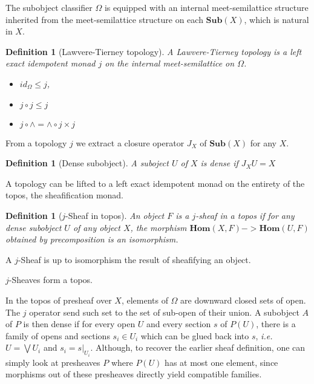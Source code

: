 \documentclass[11pt]{article}
\newtheorem{definition}[theorem]{Definition}
\newcommand{\0}{\mathbf{0}}
\newcommand{\1}{\mathbf{1}}
\begin{document}
The subobject classifier $\Omega$ is equipped with an internal meet-semilattice structure inherited from the meet-semilattice structure on each $\mathbf{Sub}(X)$, which is natural in $X$.

\begin{definition}[Lawvere-Tierney topology]
    A \emph{Lawvere-Tierney topology} is a left exact idempotent monad $j$ on the internal meet-semilattice on $\Omega$.
\begin{itemize}
    \item $ id_\Omega \leq j $,
    \item $ j\circ j \leq  j$
    \item $ j \circ \wedge = \wedge \circ j\times j$
\end{itemize}
\end{definition}

From a topology $j$ we extract a closure operator $J_X$ of $\mathbf{Sub}(X)$ for any $X$.
\begin{definition}[Dense subobject]
    A suboject $U$ of $X$ is dense if $J_XU  = X$
\end{definition}

A topology can be lifted to a left exact idempotent monad on the entirety of the topos, the sheafification monad.

\begin{definition}[$j$-Sheaf in topos]
    An object $F$ is a $j$-\emph{sheaf} in a topos if for any dense subobject $U$ of any object $X$, the morphism $\mathbf{Hom}(X, F) -> \mathbf{Hom}(U, F)$ obtained by precomposition is an isomorphism.
\end{definition}

A $j$-Sheaf is up to isomorphism the result of sheafifying an object.

$j$-Sheaves form a topos.

In the topos of presheaf over $X$, elements of $\Omega$ are downward closed sets of open. The $j$ operator send such set to the set of sub-open of their union. A subobject $A$ of $P$ is then dense if for every open $U$ and every section $s$ of $P(U)$, there is a family of opens and sections $s_i\in U_i$ which can be glued back into $s$, \emph{i.e.} $U = \bigvee U_i$ and $s_i = s|_{U_i}$. Although, to recover the earlier sheaf definition, one can simply look at presheaves $P$ where $P(U)$ has at most one element, since morphisms out of these presheaves directly yield compatible families.
\end{document}
